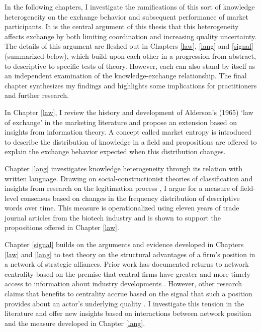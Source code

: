 In the following chapters, I investigate the ramifications of this sort of knowledge heterogeneity on the exchange behavior and subsequent performance of market participants. It is the central argument of this thesis that this heterogeneity affects exchange by both limiting coordination and increasing quality uncertainty. The details of this argument are fleshed out in Chapters \ref{law}, \ref{lang} and \ref{signal} (summarized below), which build upon each other in a progression from abstract, to descriptive to specific tests of theory. However, each can also stand by itself as an independent examination of the knowledge-exchange relationship. The final chapter synthesizes my findings and highlights some implications for practitioners and further research.

In Chapter \ref{law}, I review the history and development of Alderson's (1965) `law of exchange' in the marketing literature and propose an extension based on insights from information theory. A concept called market entropy is introduced to describe the distribution of knowledge in a field and propositions are offered to explain the exchange behavior expected when this distribution changes. 

Chapter \ref{lang} investigates knowledge heterogeneity through its relation with written language. Drawing on social-constructionist theories of classification \citep{goldberg2012} and insights from research on the legitimation process \citep{powell2008}, I argue for a measure of field-level consensus based on changes in the frequency distribution of descriptive words over time. This measure is operationalized using eleven years of trade journal articles from the biotech industry and is shown to support the propositions offered in Chapter \ref{law}. 

Chapter \ref{signal} builds on the arguments and evidence developed in Chapters \ref{law} and \ref{lang} to test theory on the structural advantages of a firm's position in a network of strategic alliances. Prior work has documented returns to network centrality based on the premise that central firms have greater and more timely access to information about industry developments \citep{powell1996, powell1999}. However, other research claims that benefits to centrality accrue based on the signal that such a position provides about an actor's underlying quality \citep{malter2014, podolny1993, podolny2005}. I investigate this tension in the literature and offer new insights based on interactions between network position and the measure developed in Chapter \ref{lang}.


